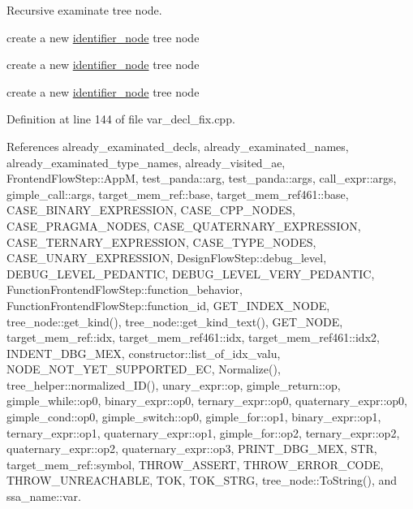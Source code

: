 Recursive examinate tree node. 

create a new \hyperlink{structidentifier__node}{identifier\+\_\+node} tree node

create a new \hyperlink{structidentifier__node}{identifier\+\_\+node} tree node

create a new \hyperlink{structidentifier__node}{identifier\+\_\+node} tree node 

Definition at line 144 of file var\+\_\+decl\+\_\+fix.\+cpp.



References already\+\_\+examinated\+\_\+decls, already\+\_\+examinated\+\_\+names, already\+\_\+examinated\+\_\+type\+\_\+names, already\+\_\+visited\+\_\+ae, Frontend\+Flow\+Step\+::\+AppM, test\+\_\+panda\+::arg, test\+\_\+panda\+::args, call\+\_\+expr\+::args, gimple\+\_\+call\+::args, target\+\_\+mem\+\_\+ref\+::base, target\+\_\+mem\+\_\+ref461\+::base, C\+A\+S\+E\+\_\+\+B\+I\+N\+A\+R\+Y\+\_\+\+E\+X\+P\+R\+E\+S\+S\+I\+ON, C\+A\+S\+E\+\_\+\+C\+P\+P\+\_\+\+N\+O\+D\+ES, C\+A\+S\+E\+\_\+\+P\+R\+A\+G\+M\+A\+\_\+\+N\+O\+D\+ES, C\+A\+S\+E\+\_\+\+Q\+U\+A\+T\+E\+R\+N\+A\+R\+Y\+\_\+\+E\+X\+P\+R\+E\+S\+S\+I\+ON, C\+A\+S\+E\+\_\+\+T\+E\+R\+N\+A\+R\+Y\+\_\+\+E\+X\+P\+R\+E\+S\+S\+I\+ON, C\+A\+S\+E\+\_\+\+T\+Y\+P\+E\+\_\+\+N\+O\+D\+ES, C\+A\+S\+E\+\_\+\+U\+N\+A\+R\+Y\+\_\+\+E\+X\+P\+R\+E\+S\+S\+I\+ON, Design\+Flow\+Step\+::debug\+\_\+level, D\+E\+B\+U\+G\+\_\+\+L\+E\+V\+E\+L\+\_\+\+P\+E\+D\+A\+N\+T\+IC, D\+E\+B\+U\+G\+\_\+\+L\+E\+V\+E\+L\+\_\+\+V\+E\+R\+Y\+\_\+\+P\+E\+D\+A\+N\+T\+IC, Function\+Frontend\+Flow\+Step\+::function\+\_\+behavior, Function\+Frontend\+Flow\+Step\+::function\+\_\+id, G\+E\+T\+\_\+\+I\+N\+D\+E\+X\+\_\+\+N\+O\+DE, tree\+\_\+node\+::get\+\_\+kind(), tree\+\_\+node\+::get\+\_\+kind\+\_\+text(), G\+E\+T\+\_\+\+N\+O\+DE, target\+\_\+mem\+\_\+ref\+::idx, target\+\_\+mem\+\_\+ref461\+::idx, target\+\_\+mem\+\_\+ref461\+::idx2, I\+N\+D\+E\+N\+T\+\_\+\+D\+B\+G\+\_\+\+M\+EX, constructor\+::list\+\_\+of\+\_\+idx\+\_\+valu, N\+O\+D\+E\+\_\+\+N\+O\+T\+\_\+\+Y\+E\+T\+\_\+\+S\+U\+P\+P\+O\+R\+T\+E\+D\+\_\+\+EC, Normalize(), tree\+\_\+helper\+::normalized\+\_\+\+I\+D(), unary\+\_\+expr\+::op, gimple\+\_\+return\+::op, gimple\+\_\+while\+::op0, binary\+\_\+expr\+::op0, ternary\+\_\+expr\+::op0, quaternary\+\_\+expr\+::op0, gimple\+\_\+cond\+::op0, gimple\+\_\+switch\+::op0, gimple\+\_\+for\+::op1, binary\+\_\+expr\+::op1, ternary\+\_\+expr\+::op1, quaternary\+\_\+expr\+::op1, gimple\+\_\+for\+::op2, ternary\+\_\+expr\+::op2, quaternary\+\_\+expr\+::op2, quaternary\+\_\+expr\+::op3, P\+R\+I\+N\+T\+\_\+\+D\+B\+G\+\_\+\+M\+EX, S\+TR, target\+\_\+mem\+\_\+ref\+::symbol, T\+H\+R\+O\+W\+\_\+\+A\+S\+S\+E\+RT, T\+H\+R\+O\+W\+\_\+\+E\+R\+R\+O\+R\+\_\+\+C\+O\+DE, T\+H\+R\+O\+W\+\_\+\+U\+N\+R\+E\+A\+C\+H\+A\+B\+LE, T\+OK, T\+O\+K\+\_\+\+S\+T\+RG, tree\+\_\+node\+::\+To\+String(), and ssa\+\_\+name\+::var.



